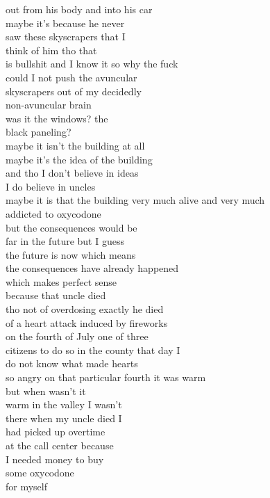 \begin{flushleft}
\begin{paracol}{3}
out from his body and into his car\\
maybe it’s because he never\\
saw these skyscrapers that I\\
think of him tho that\\
is bullshit and I know it so why the fuck\\
could I not push the avuncular\\
skyscrapers out of my decidedly\\
non-avuncular brain\\
was it the windows? the\\
black paneling?\\
maybe it isn’t the building at all\\
maybe it’s the idea of the building\\
and tho I don’t believe in ideas\\
I do believe in uncles\\
maybe it is that the building
\switchcolumn[2]
very much alive and very much\\
addicted to oxycodone\\
but the consequences would be\\
far in the future but I guess\\
the future is now which means\\
the consequences have already happened\\
which makes perfect sense\\
because that uncle died\\
tho not of overdosing exactly he died\\
of a heart attack induced by fireworks\\
on the fourth of July one of three\\
citizens to do so in the county that day I\\
do not know what made hearts\\
so angry on that particular fourth it was warm\\
but when wasn’t it\\
warm in the valley I wasn’t\\
there when my uncle died I\\
had picked up overtime\\
at the call center because\\
I needed money to buy\\ %
some oxycodone\\
for myself\\

\end{paracol}
\end{flushleft}
